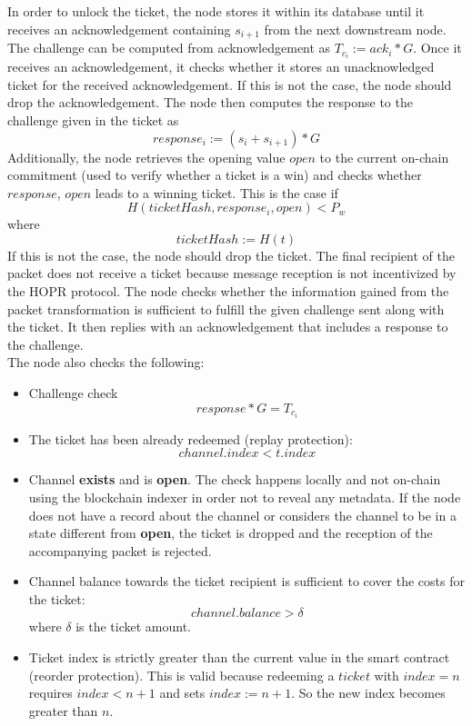 In order to unlock the ticket, the node stores it within its database until it receives an acknowledgement containing $s_{i+1}$ from the next downstream node. 
The challenge can be computed from acknowledgement as $T_{c_i}:=ack_i*G$.
\newline Once it receives an acknowledgement, it checks whether it stores an unacknowledged ticket for the received acknowledgement. 
If this is not the case, the node should drop the acknowledgement.  
\newline The node then computes the response to the challenge given in the ticket as $$response_i:=(s_i+s_{i+1})*G$$
Additionally, the node retrieves the opening value $open$ to the current on-chain commitment (used to verify whether a ticket is a win) and checks whether $response$, $open$ leads to a winning ticket. 
This is the case if $$H( ticketHash, response_i, open ) <P_w$$ where $$ticketHash:=H(t)$$
If this is not the case, the node should drop the ticket. 
The final recipient of the packet does not receive a ticket because message reception is not incentivized by the HOPR protocol.
\newline The node checks whether the information gained from the packet transformation is sufficient to fulfill the given challenge sent along with the ticket. It then replies with an acknowledgement that includes a response to the challenge.
\\ The node also checks the following:
\begin{itemize}
    \item Challenge check $$response*G=T_{c_i}$$
    \item The ticket has been already redeemed (replay protection): $$channel.index <t.index$$
    \item Channel \textbf{exists} and is \textbf{open}. The check happens locally and not on-chain using the blockchain indexer in order not to reveal any metadata. If the node does not have a record about the channel or considers the channel to be in a state different from \textbf{open}, the ticket is dropped and the reception of the accompanying packet is rejected.
    \item Channel balance towards the ticket recipient is sufficient to cover the costs for the ticket: $$ channel.balance>\delta$$ where $\delta$ is the ticket amount. 
    \item Ticket index is strictly greater than the current value in the smart contract (reorder protection). This is valid because redeeming a $ticket$ with $index=n$ requires $index < n+1$ and sets $index := n+1$. So the new index becomes greater than $n$.


\end{itemize}  









